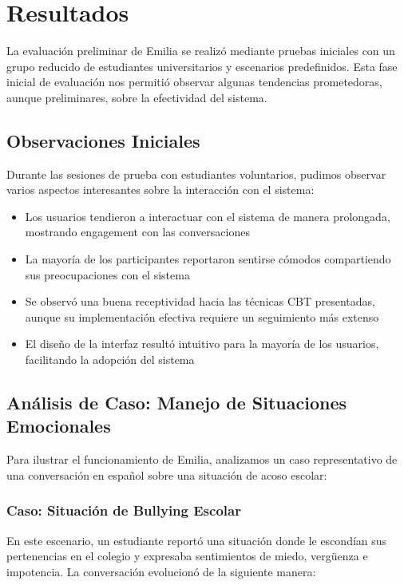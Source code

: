 \documentclass[conference]{IEEEtran}
\begin{document}
\section{Resultados}
La evaluación preliminar de Emilia se realizó mediante pruebas iniciales con un grupo reducido de estudiantes universitarios y escenarios predefinidos. Esta fase inicial de evaluación nos permitió observar algunas tendencias prometedoras, aunque preliminares, sobre la efectividad del sistema.

\subsection{Observaciones Iniciales}
Durante las sesiones de prueba con estudiantes voluntarios, pudimos observar varios aspectos interesantes sobre la interacción con el sistema:

\begin{itemize}
\item Los usuarios tendieron a interactuar con el sistema de manera prolongada, mostrando engagement con las conversaciones
\item La mayoría de los participantes reportaron sentirse cómodos compartiendo sus preocupaciones con el sistema
\item Se observó una buena receptividad hacia las técnicas CBT presentadas, aunque su implementación efectiva requiere un seguimiento más extenso
\item El diseño de la interfaz resultó intuitivo para la mayoría de los usuarios, facilitando la adopción del sistema
\end{itemize}

\subsection{Análisis de Caso: Manejo de Situaciones Emocionales}
Para ilustrar el funcionamiento de Emilia, analizamos un caso representativo de una conversación en español sobre una situación de acoso escolar:

\subsubsection{Caso: Situación de Bullying Escolar}
En este escenario, un estudiante reportó una situación donde le escondían sus pertenencias en el colegio y expresaba sentimientos de miedo, vergüenza e impotencia. La conversación evolucionó de la siguiente manera:
\end{document}
